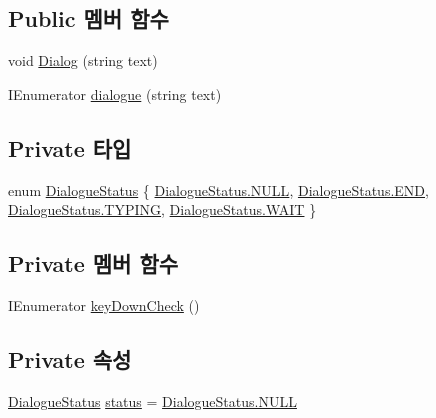 \subsection*{Public 멤버 함수}
\begin{DoxyCompactItemize}
\item 
void \mbox{\hyperlink{class_dialogue_ae229890e6405d952e2776a4d5410e29b}{Dialog}} (string text)
\item 
I\+Enumerator \mbox{\hyperlink{class_dialogue_af18f0f9a1ab343d1c870f63e05b765a6}{dialogue}} (string text)
\end{DoxyCompactItemize}
\subsection*{Private 타입}
\begin{DoxyCompactItemize}
\item 
enum \mbox{\hyperlink{class_dialogue_a4fc50ccc0dec0191d8e89bb8cf1b9431}{Dialogue\+Status}} \{ \mbox{\hyperlink{class_dialogue_a4fc50ccc0dec0191d8e89bb8cf1b9431a6c3e226b4d4795d518ab341b0824ec29}{Dialogue\+Status.\+N\+U\+LL}}, 
\mbox{\hyperlink{class_dialogue_a4fc50ccc0dec0191d8e89bb8cf1b9431ab1a326c06d88bf042f73d70f50197905}{Dialogue\+Status.\+E\+ND}}, 
\mbox{\hyperlink{class_dialogue_a4fc50ccc0dec0191d8e89bb8cf1b9431ab0aa6b27b6dcfa3c6257fdadd2bf7214}{Dialogue\+Status.\+T\+Y\+P\+I\+NG}}, 
\mbox{\hyperlink{class_dialogue_a4fc50ccc0dec0191d8e89bb8cf1b9431ad5cc6a0064b5c25ba37826aa3fda910c}{Dialogue\+Status.\+W\+A\+IT}}
 \}
\end{DoxyCompactItemize}
\subsection*{Private 멤버 함수}
\begin{DoxyCompactItemize}
\item 
I\+Enumerator \mbox{\hyperlink{class_dialogue_adc5315af502ab7bd4a3540b7d30ed023}{key\+Down\+Check}} ()
\end{DoxyCompactItemize}
\subsection*{Private 속성}
\begin{DoxyCompactItemize}
\item 
\mbox{\hyperlink{class_dialogue_a4fc50ccc0dec0191d8e89bb8cf1b9431}{Dialogue\+Status}} \mbox{\hyperlink{class_dialogue_a8a603464c7f617f5fd96e4c2191034d5}{status}} = \mbox{\hyperlink{class_dialogue_a4fc50ccc0dec0191d8e89bb8cf1b9431a6c3e226b4d4795d518ab341b0824ec29}{Dialogue\+Status.\+N\+U\+LL}}
\end{DoxyCompactItemize}


